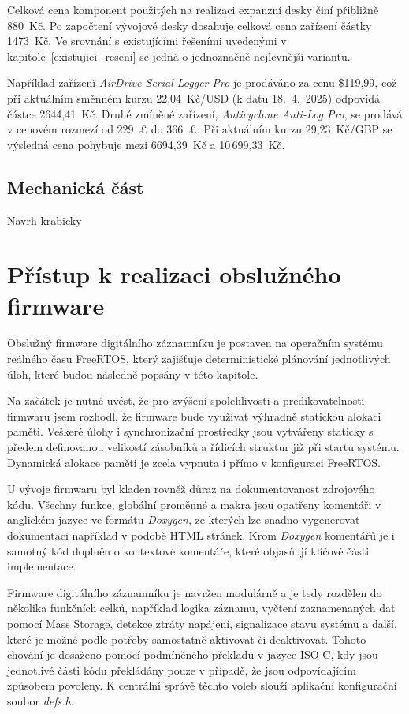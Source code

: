 Celková cena komponent použitých na realizaci expanzní desky činí přibližně 880~Kč. Po započtení vývojové desky dosahuje celková cena zařízení částky 1473~Kč. Ve srovnání s existujícími řešeními uvedenými v kapitole~\ref{existujici_reseni} se jedná o jednoznačně nejlevnější variantu.

Například zařízení \textit{AirDrive Serial Logger Pro} je prodáváno za cenu \$119{,}99, což při aktuálním směnném kurzu 22{,}04~Kč/USD (k datu 18.~4.~2025) odpovídá částce 2644{,}41~Kč. Druhé zmíněné zařízení, \textit{Anticyclone Anti-Log Pro}, se prodává v cenovém rozmezí od 229~£ do 366~£. Při aktuálním kurzu 29{,}23~Kč/GBP se výsledná cena pohybuje mezi 6694{,}39~Kč a 10\,699{,}33~Kč.

\newpage

\section{Mechanická část}
Navrh krabicky

\chapter{Přístup k realizaci obslužného firmware}
\label{softwarova_implementace}
Obslužný firmware digitálního záznamníku je postaven na operačním systému reálného času FreeRTOS, který zajišťuje deterministické plánování jednotlivých úloh, které budou následně popsány v této kapitole.

Na začátek je nutné uvést, že pro zvýšení spolehlivosti a predikovatelnosti firmwaru jsem rozhodl, že firmware bude využívat výhradně statickou alokaci paměti. Veškeré úlohy i synchronizační prostředky jsou vytvářeny staticky s předem definovanou velikostí zásobníků a řídicích struktur již při startu systému. Dynamická alokace paměti je zcela vypnuta i přímo v konfiguraci FreeRTOS.

U vývoje firmwaru byl kladen rovněž důraz na dokumentovanost zdrojového kódu. Všechny funkce, globální proměnné a makra jsou opatřeny komentáři v anglickém jazyce ve formátu \textit{Doxygen}, ze kterých lze snadno vygenerovat dokumentaci například v podobě HTML stránek. Krom \textit{Doxygen} komentářů je i samotný kód doplněn o kontextové komentáře, které objasňují klíčové části implementace.

Firmware digitálního záznamníku je navržen modulárně a je tedy rozdělen do několika funkčních celků, například logika záznamu, vyčtení zaznamenaných dat pomocí Mass Storage, detekce ztráty napájení, signalizace stavu systému a další, které je možné podle potřeby samostatně aktivovat či deaktivovat. Tohoto chování je dosaženo pomocí podmíněného překladu v jazyce ISO C, kdy jsou jednotlivé části kódu překládány pouze v případě, že jsou odpovídajícím způsobem povoleny. K centrální správě těchto voleb slouží aplikační konfigurační soubor \textit{defs.h}. 


